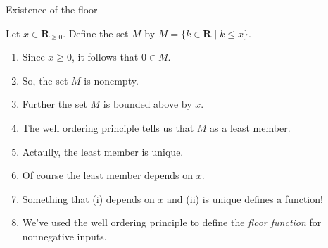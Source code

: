 \documentclass[fleqn]{beamer}
\newcommand{\reals}{\mathbf{R}}
\theoremstyle{definition}
\newenvironment{numberlist}
   {\begin{enumerate}[(1)]
       \addtolength{\itemsep}{-0.5\itemsep}}
     {\end{enumerate}}
\begin{document}
\begin{frame}{Existence of the floor}

Let \(x \in \reals_{\geq 0}\). Define the set \(M\) by
\(
     M = \{k \in \reals \mid k \leq x \}
\).

\begin{numberlist}

 \item Since \(x \geq 0\), it follows that \(0 \in M\).

\vspace{0.15in}
 \item So, the set \(M\) is nonempty.
\vspace{0.15in}
 \item Further the set \(M\) is bounded above by \(x\).
\vspace{0.15in}
  \item The well ordering principle tells us that \(M\) as
  a least member.
\vspace{0.15in}
  \item Actaully, the least member is unique.
\vspace{0.15in}
  \item Of course the least member depends on \(x\).
\vspace{0.15in}
  \item Something that (i) depends on \(x\) and (ii) is unique defines a function!
\vspace{0.15in}
  \item We've used the well ordering principle to define the \emph{floor function} for nonnegative inputs.





\end{numberlist}
\end{frame}
\end{document}
